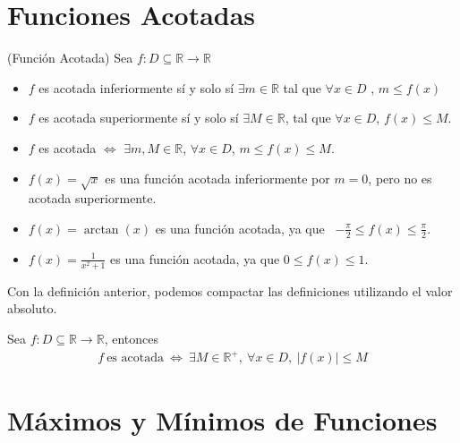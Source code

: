 \documentclass[12pt]{book}
\begin{document}
\section{Funciones Acotadas}

\begin{defi}{(Función Acotada)}{}
    Sea $f: D \subseteq \mathbb{R} \to \mathbb{R}$
\begin{itemize}
    \item $f$ es acotada inferiormente sí y solo sí $\exists m\in \mathbb{R}$ tal que $\forall x \in D$ , $m \leq f(x)$
    \item $f$ es acotada superiormente sí y solo sí $\exists M \in \mathbb{R}$, tal que $\forall x  \in D$, $f(x) \leq M$.

      \item $f$ es acotada $\Longleftrightarrow$ $\exists m , M \in \mathbb{R}$, $\forall x \in D$, $m \leq f(x) \leq M$.
    
\end{itemize}
\end{defi}

\begin{eje}{}{}
    \begin{itemize}

    \item $f(x)=\sqrt{x}$ es una función acotada inferiormente por $m=0$, pero no es acotada superiormente.

    \item $f(x)=\arctan(x)$ es una función acotada, ya que \  $\displaystyle -\frac{\pi}{2}\leq f(x) \leq \frac{\pi}{2}$.
        \item $f(x)=\displaystyle \frac{1}{x^2+1}$ es una función acotada, ya que $0\leq f(x)\leq 1$.
    \end{itemize}
\end{eje}

Con la definición anterior, podemos compactar las definiciones utilizando el valor absoluto.

\begin{prop}{}{}
Sea $f: D \subseteq \mathbb{R} \to \mathbb{R}$, entonces
    \begin{align*}
       f \ \text{es acotada} \ \Longleftrightarrow \ \exists M \in \mathbb{R}^+, \  \forall x \in D, \ |f(x)|\leq M
    \end{align*}
\end{prop}

\section{Máximos y Mínimos de Funciones}
\end{document}
